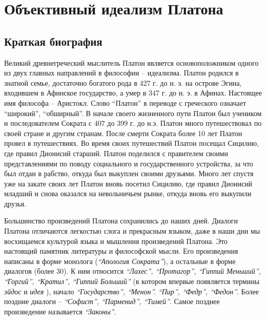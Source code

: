 \documentclass[
]{article}
\begin{document}
\hypertarget{ux43eux431ux44aux435ux43aux442ux438ux432ux43dux44bux439-ux438ux434ux435ux430ux43bux438ux437ux43c-ux43fux43bux430ux442ux43eux43dux430}{%
\section{Объективный идеализм
Платона}\label{ux43eux431ux44aux435ux43aux442ux438ux432ux43dux44bux439-ux438ux434ux435ux430ux43bux438ux437ux43c-ux43fux43bux430ux442ux43eux43dux430}}

\hypertarget{ux43aux440ux430ux442ux43aux430ux44f-ux431ux438ux43eux433ux440ux430ux444ux438ux44f}{%
\subsection{Краткая
биография}\label{ux43aux440ux430ux442ux43aux430ux44f-ux431ux438ux43eux433ux440ux430ux444ux438ux44f}}

Великий древнегреческий мыслитель Платон является основоположником
одного из двух главных направлений в философии -- идеализма. Платон
родился в знатной семье, достаточно богатого рода в 427 г. до н. э. на
острове Эгина, входившем в Афинское государство, а умер в 347 г. до н.
э. в Афинах. Настоящее имя философа -- Аристокл. Слово ``Платон'' в
переводе с греческого означает ``широкий'', ``обширный''. В начале
своего жизненного пути Платон был учеником и последователем Сократа с
407 до 399 г. до н.э. Платон много путешествовал по своей стране и
другим странам. После смерти Сократа более 10 лет Платон провел в
путешествиях. Во время своих путешествий Платон посещал Сицилию, где
правил Дионисий старший. Платон поделился с правителем своими
представлениями по поводу социального и государственного устройства, за
что был отдан в рабство, откуда был выкуплен своими друзьями. Много лет
спустя уже на закате своих лет Платон вновь посетил Сицилию, где правил
Дионисий младший и снова оказался на невольничьем рынке, откуда вновь
его выкупили друзья.

Большинство произведений Платона сохранились до наших дней. Диалоги
Платона отличаются легкостью слога и прекрасным языком, даже в наши дни
мы восхищаемся культурой языка и мышления произведений Платона. Это
настоящий памятник литературы и философской мысли. Его произведения
написаны в форме монолога (\emph{``Апология Сократа''}), а остальные в
форме диалогов (более 30). К ним относится \emph{``Лахес'',
``Протагор'', ``Гиппий Меньший'', ``Горгий'', ``Кратил'', ``Гиппий
Больший''} (в котором впервые появляется термины \emph{эйдос} и
\emph{идея} ), начало \emph{``Государство'', ``Менон''. ``Пир'',
``Федр'', ``Федон''}. Более поздние диалоги -- \emph{``Софист'',
``Парменид'', ``Тимей''}. Самое позднее произведение называется
\emph{``Законы''}.
\end{document}
